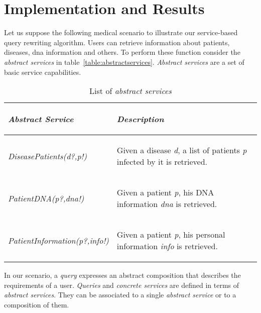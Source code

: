 \section{Implementation and Results}
\label{sec:implementationandresults}  
Let us suppose the following medical scenario to illustrate our service-based query rewriting algorithm. Users can retrieve information about patients, diseases, dna information and others.
To perform these function consider the \textit{abstract services} in table~\ref{table:abstractservices}. 
\textit{Abstract services} are a set of basic service capabilities. 

\begin{table}[h!]
\center
\begin{tabular}{|p{3.7cm}|p{4cm}|}
\hline
\begin{small} \textbf{\textit{Abstract Service}} \end{small} & \begin{small}\textbf{\textit{Description}} \end{small}\\ 
\hline 
\begin{small} \textit{DiseasePatients(d?,p!)} \end{small} & \begin{small} Given a disease \textit{d}, a list of patients \textit{p} infected by it is retrieved. \end{small}\\ 
\hline 
\begin{small} \textit{PatientDNA(p?,dna!)} \end{small} & \begin{small} Given a patient \textit{p}, his DNA information \textit{dna} is retrieved. \end{small}\\ 
\hline 
\begin{small} \textit{PatientInformation(p?,info!)} \end{small} & \begin{small} Given a patient \textit{p}, his personal information \textit{info} is retrieved. \end{small}\\ 
\hline 
\end{tabular} \caption{List of \textit{abstract services}}
\end{table}\label{table:abstractservices}

In our scenario, a \textit{query} expresses an abstract composition that describes the requirements of a user.
\textit{Queries} and \textit{concrete services} are defined in terms of \textit{abstract services}.
They can be associated to a single \textit{abstract service} or to a composition of them.


